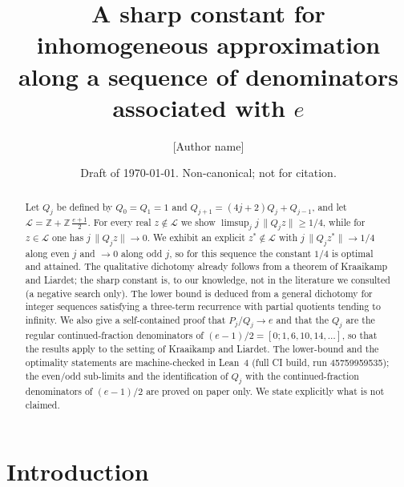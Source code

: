 \documentclass[11pt]{amsart}
\theoremstyle{remark}
\newcommand{\Z}{\mathbb{Z}}
\newcommand{\dist}[1]{\lVert #1\rVert}
\newcommand{\LL}{\mathcal{L}}
\begin{document}
\title[A sharp constant along denominators associated with $e$]{A sharp constant for inhomogeneous approximation along a sequence of denominators associated with $e$}

\author{[Author name]}
\date{Draft of \today. Non-canonical; not for citation.}

\begin{abstract}
Let $Q_j$ be defined by $Q_0=Q_1=1$ and $Q_{j+1}=(4j+2)Q_j+Q_{j-1}$, and let
$\LL=\Z+\Z\,\frac{e+1}{2}$. For every real $z\notin\LL$ we show
$\limsup_j j\,\dist{Q_j z}\ge 1/4$, while for $z\in\LL$ one has
$j\,\dist{Q_jz}\to0$. We exhibit an explicit $z^*\notin\LL$ with
$j\,\dist{Q_jz^*}\to 1/4$ along even $j$ and $\to0$ along odd $j$, so for this sequence the constant
$1/4$ is optimal and attained. The qualitative dichotomy already follows from a theorem of
Kraaikamp and Liardet; the sharp constant is, to our knowledge, not in the literature we consulted
(a negative search only). The lower bound is deduced from a general dichotomy for
integer sequences satisfying a three-term recurrence with partial quotients tending to
infinity. We also give a self-contained proof that $P_j/Q_j\to e$ and that the $Q_j$ are the
regular continued-fraction denominators of $(e-1)/2=[0;1,6,10,14,\dots]$, so that the results
apply to the setting of Kraaikamp and Liardet. The lower-bound and the optimality statements are machine-checked in Lean~4 (full CI build, run 45759959535);
the even/odd sub-limits and the identification of $Q_j$ with the continued-fraction denominators
of $(e-1)/2$ are proved on paper only. We state explicitly what is not claimed.
\end{abstract}

\maketitle

\section{Introduction}
\end{document}
